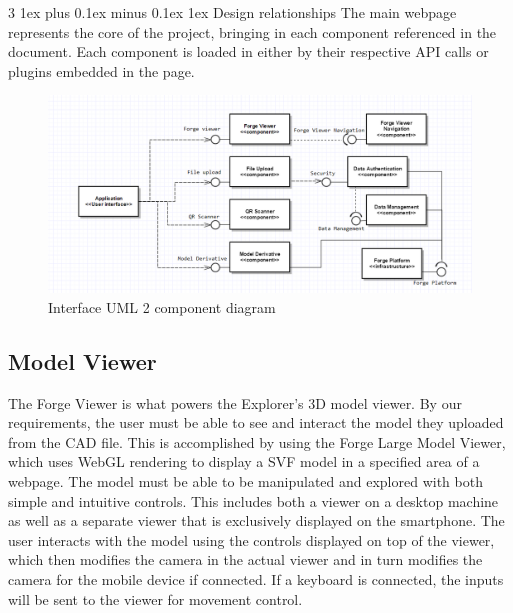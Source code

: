 \documentclass[letterpaper, 10pt, draftclsnofoot, compsoc, onecolumn]{IEEEtran}
\makeatletter
\def\subsubsection{\@startsection{subsubsection}%
                                 {3}%
                                 {\z@}%
                                 {1ex plus 0.1ex minus 0.1ex}%
                                 {1ex}%
                                 {\normalfont\normalsize}}%
\makeatother
\begin{document}
\subsubsection{Design relationships}
The main webpage represents the core of the project, bringing in each component referenced in the document. Each component is loaded in either  by their respective API calls or plugins embedded in the page.
\begin{figure}[ht]
	\includegraphics[scale=0.30]{WebInterface.png}
	\caption{Interface UML 2 component diagram}
\end{figure}

\subsection{Model Viewer}
\label{modelView}
The Forge Viewer is what powers the Explorer's 3D model viewer. By our requirements, the user must be able to see and interact the model they uploaded from the CAD file. This is accomplished by using the Forge Large Model Viewer, which uses WebGL rendering to display a SVF model in a specified area of a webpage. The model must be able to be manipulated and explored with both simple and intuitive controls. This includes both a viewer on a desktop machine as well as a separate viewer that is exclusively displayed on the smartphone. The user interacts with the model using the controls displayed on top of the viewer, which then modifies the camera in the actual viewer and in turn modifies the camera for the mobile device if connected. If a keyboard is connected, the inputs will be sent to the viewer for movement control.
\end{document}

